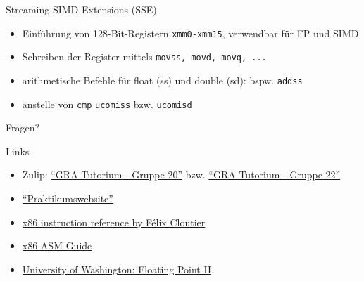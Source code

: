 \documentclass[
  german,            %
  aspectratio=169,    %
]{tumbeamer}
\begin{document}
\begin{frame}[c, fragile]{Streaming SIMD Extensions (SSE)}{}
  \begin{itemize}
    \item Einführung von 128-Bit-Registern \verb|xmm0-xmm15|, verwendbar für FP und SIMD
    \item Schreiben der Register mittels \verb|movss, movd, movq, ...|
    \item arithmetische Befehle für float (ss) und double (sd): bspw. \verb|addss|
    \item anstelle von \verb|cmp| \verb|ucomiss| bzw. \verb|ucomisd|
  \end{itemize}
\end{frame}

\begin{frame}[c]{}{}
  \begin{center}
    \LARGE Fragen?
  \end{center}
\end{frame}

\begin{frame}[fragile, c]{Links}{}
  \begin{itemize}
    \item Zulip: \href{https://zulip.in.tum.de/#narrow/stream/2267-GRA-Tutorium---Gruppe-20}{\enquote{GRA Tutorium - Gruppe 20}}
          bzw. \href{https://zulip.in.tum.de/#narrow/stream/2269-GRA-Tutorium---Gruppe-22}{\enquote{GRA Tutorium - Gruppe 22}}
    \item \href{https://gra.caps.in.tum.de}{\enquote{Praktikumswebsite}}
    \item \href{https://www.felixcloutier.com/x86/}{x86 instruction reference by Félix Cloutier}
    \item \href{https://flint.cs.yale.edu/cs421/papers/x86-asm/asm.html}{x86 ASM Guide}
    \item \href{https://courses.cs.washington.edu/courses/cse351/19wi/lectures/07/CSE351-L07-fp-II-x86intro-19wi.pdf}{University of Washington: Floating Point II}
  \end{itemize}
\end{frame}

\maketitle
\end{document}
